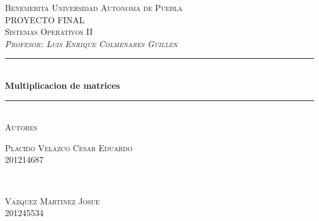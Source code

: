 \documentclass[12pt]{article}
\begin{document}
\begin{titlepage}

\newcommand{\HRule}{\rule{\linewidth}{0.5mm}} %

\begin{center}
 

\textsc{\LARGE Benemerita Universidad Autonoma de Puebla}\\[1.2cm] %
\textsc{\Large PROYECTO FINAL}\\[0.8cm] %
\textsc{\Large Sistemas Operativos II}\\[0.5cm] %
\textsc \emph{\large Profesor: Luis Enrique Colmenares Guillen}\\[0.3cm] %


\HRule \\[0.4cm]
{ \huge \bfseries Multiplicacion de matrices}\\[0.4cm] %
\HRule \\[1cm]
\textsc{\Large Autores}\\[0.3cm] %
\begin{minipage}{0.5\textwidth}
\begin{flushleft} \large
\centering \textsc{Placido Velazco Cesar Eduardo\\   201214687} %
\end{flushleft}
\end{minipage}
~
\begin{minipage}{0.3\textwidth}
\begin{flushright} \large
\centering \textsc{Vazquez Martinez Josue\\201245534} %
\end{flushright}
\end{minipage}\\ [1cm]


\end{center}
\end{titlepage}
\end{document}
